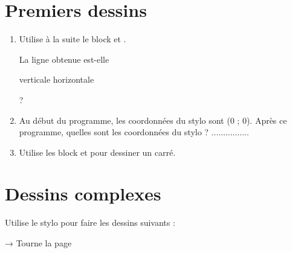 \documentclass[a4paper,11pt]{article}
\begin{document}
\section{Premiers dessins}

\begin{enumerate}
	\item Utilise à la suite le block  et .

	      La ligne obtenue est-elle \vspace{0.5em}

	      \hspace{3em} verticale \hfill horizontale \hspace{3em}

	      ?
	\item  Au début du programme, les coordonnées du stylo sont (0 ; 0). Après ce programme, quelles sont les coordonnées du stylo ? ................
	\item Utilise les block  et  pour dessiner un carré.
\end{enumerate}

\section{Dessins complexes}

Utilise le stylo pour faire les dessins suivants : 

\hfill → {\footnotesize Tourne la page}
\end{document}
